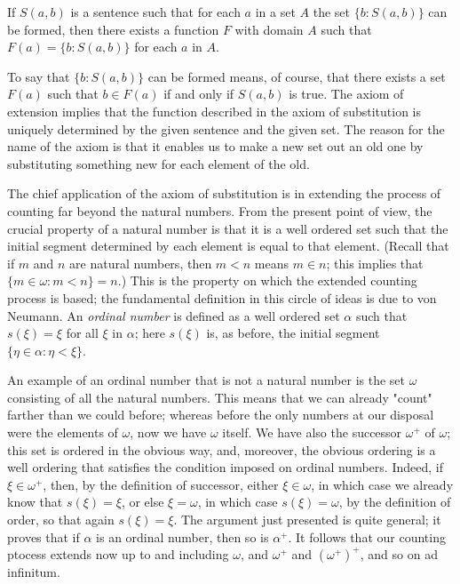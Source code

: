 \begin{named} If $S(a,b)$ is a sentence such that for each $a$ in a set $A$ the set $\{ b: S(a, b) \}$ can be formed, then there exists a function $F$ with domain $A$ such that $F(a) = \{ b: S(a,b) \} $ for each $a$ in $A$.
\end{named}

To say that $\{ b: S(a,b) \} $ can be formed means, of course, that there exists a set $F(a)$ such that $b \in F(a)$ if and only if $S(a,b)$ is true. The axiom of extension implies that the function described in the axiom of substitution is uniquely determined by the given sentence and the given set. The reason for the name of the axiom is that it enables us to make a new set out an old one by substituting something new for each element of the old. 

The chief application of the axiom of substitution is in extending the process of counting far beyond the natural numbers. From the present point of view, the crucial property of a natural number is that it is a well ordered set such that the initial segment determined by each element is equal to that element. (Recall that if $m$ and $n$ are natural numbers, then $m < n$ means $m \in n$; this implies that $\{ m \in \omega : m <n \} = n$.) This is the property on which the extended counting process is based; the fundamental definition in this circle of ideas is due to von Neumann. An \textit{ordinal number} is defined as a well ordered set $\alpha$ such that $s( \xi ) = \xi$ for all $\xi $ in $\alpha$; here $s( \xi )$ is, as before, the initial segment $\{ \eta \in \alpha: \eta < \xi \} $.

An example of an ordinal number that is not a natural number is the set $\omega$ consisting of all the natural numbers. This means that we can already "count" farther than we could before; whereas before the only numbers at our disposal were the elements of $\omega$, now we have $\omega$ itself. We have also the successor $ \omega^{+}$ of $\omega$; this set is ordered in the obvious way, and, moreover, the obvious ordering is a well ordering that satisfies the condition imposed on ordinal numbers. Indeed, if $\xi \in \omega^{+}$, then, by the definition of successor, either $\xi \in \omega$, in which case we already know that $s( \xi ) = \xi$, or else $ \xi = \omega$, in which case $s( \xi ) =  \omega$, by the definition of order, so that again $s( \xi ) = \xi$. The argument just presented is quite general; it proves that if $\alpha$ is an ordinal number, then so is $\alpha^{+}$. It follows that our counting ptocess extends now up to and including $\omega$, and $\omega^{+}$ and $(\omega^{+})^{+}$, and so on ad infinitum.

